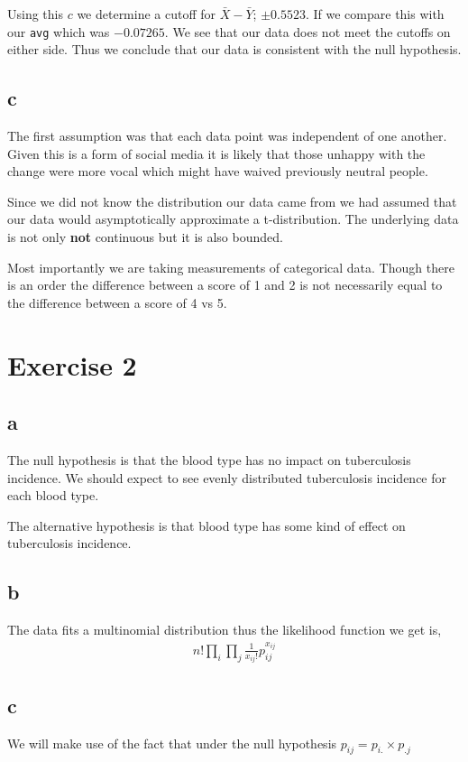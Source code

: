 \documentclass{article}
\begin{document}
Using this $c$ we determine a cutoff for $\bar{X} - \bar{Y}$;
$\pm0.5523$. If we 
compare this with our \texttt{avg} which was $-0.07265$. We see that our data
does not meet the cutoffs on either side. Thus we conclude that our data is
consistent with the null hypothesis.

\subsection{c}
The first assumption was that each data point was independent of one another.
Given this is a form of social media it is likely that those unhappy with the
change were more vocal which might have waived previously neutral people.

Since we did not know the distribution our data came from we had assumed that
our data would asymptotically approximate a t-distribution. The underlying data
is not only \textbf{not} continuous but it is also bounded.

Most importantly we are taking measurements of categorical data. Though there is
an order the difference between a score of 1 and 2 is not necessarily equal to
the difference between a score of 4 vs 5.

\section{Exercise 2}
\subsection{a}
The null hypothesis is that the blood type has no impact on tuberculosis 
incidence. We should expect to see evenly distributed tuberculosis incidence
for each blood type.

The alternative hypothesis is that blood type has some kind of effect on
tuberculosis incidence.

\subsection{b}
The data fits a multinomial distribution thus the likelihood function we get is,
\begin{align*}
    n! \prod_{i} \prod_{j} \frac{1}{x_{ij}!} p_{ij}^{x_{ij}}
\end{align*}

\subsection{c}
We will make use of the fact that under the null hypothesis
$p_{ij} = p_{i.} \times p_{.j}$
\end{document}
